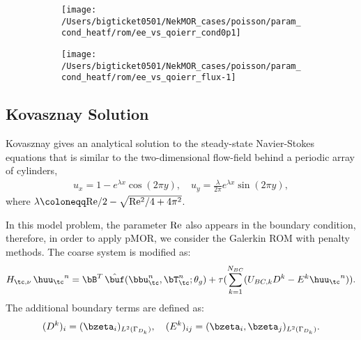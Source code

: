 \begin{figure}[!h]
     \centering
     \begin{subfigure}[b]{0.45\textwidth}
         \centering
         \texttt{[image: /Users/bigticket0501/NekMOR\_cases/poisson/param\_cond\_heatf/rom/ee\_vs\_qoierr\_cond0p1]}
     \end{subfigure}
     \hfill
     \begin{subfigure}[b]{0.45\textwidth}
         \centering
         \texttt{[image: /Users/bigticket0501/NekMOR\_cases/poisson/param\_cond\_heatf/rom/ee\_vs\_qoierr\_flux-1]}
     \end{subfigure}
\end{figure}

\newpage
\subsection{Kovasznay Solution}
Kovasznay gives an analytical solution to the steady-state Navier-Stokes
equations that is similar to the two-dimensional flow-field behind a periodic
array of cylinders,
\begin{align}
   u_x = 1-e^{\lambda x} \cos(2 \pi y), \quad u_y = \frac{\lambda}{2\pi}
   e^{\lambda x} \sin(2 \pi y),
\end{align}
where $\lambda \coloneqq \rm Re/2 - \sqrt{\rm Re^2/4 + 4\pi^2}$. 

In this model problem, the parameter $\rm Re$ also appears in the boundary
condition, therefore, in order to apply pMOR, we consider the Galerkin ROM with
penalty methods. The coarse system is modified as:
\begin{equation} \label{eq:rom}
     H_{\tc,\nu}  \,{\huu_\tc}^n  = \bB^T \, {\hat \buf}(\bbu_\tc^n,\bT_\tc^n;
     \theta_g) + \tau ( \sum^{N_{BC}}_{k=1}( U_{BC,k} D^k - E^k{\huu_\tc}^n )).
\end{equation}
The additional boundary terms are defined as:
\begin{equation}
   (D^k)_i = (\bzeta_i)_{L^2(\Gamma_{D_k})},\quad (E^k)_{ij} = (\bzeta_i,
   \bzeta_j)_{L^2(\Gamma_{D_k})}.
\end{equation}


